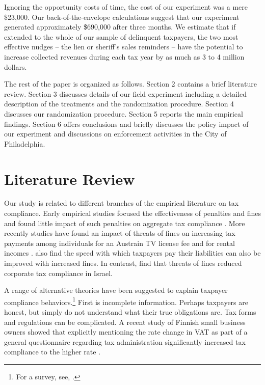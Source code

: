 \documentclass[12pt]{article}
\begin{document}
Ignoring the opportunity costs of time, the cost of our experiment was
a mere \$23,000.  Our back-of-the-envelope calculations suggest that
our experiment generated approximately \$690,000 after three
months. We estimate that if extended to the whole of our sample of
delinquent taxpayers, the two most effective nudges -- the lien or
sheriff's sales reminders -- have the potential to increase collected
revenues during each tax year by as much as 3 to 4 million dollars.

The rest of the paper is organized as follows. Section 2 contains a
brief literature review. Section 3 discusses details of our field
experiment including a detailed description of the treatments and the
randomization procedure. Section 4 discusses our randomization
procedure.  Section 5 reports the main empirical findings. Section 6
offers conclusions and briefly discusses the policy impact of our
experiment and discussions on enforcement activities in the City of
Philadelphia.
    

\section{Literature Review}

Our study is related to different branches of the empirical literature
on tax compliance. Early empirical studies focused the effectiveness
of penalties and fines and found little impact of such penalties on
aggregate tax compliance \cite{Slemrod-07}.  More recently studies
have found an impact of threats of fines on increasing tax payments
among individuals for an Austrain TV license fee \cite{Fellner-13} and
for rental incomes \cite{Wenzel-Taylor-04}.  
also find the speed with which taxpayers pay their liabilities can
also be improved with increased fines.  In contrast, 
find that threats of fines reduced corporate tax compliance in Israel.

A range of alternative theories have been suggested to explain
taxpayer compliance behaviors.\footnote{For a survey, see,
  .}  First is incomplete
information.  Perhaps taxpayers are honest, but simply do not
understand what their true obligations are. Tax forms and regulations
can be complicated.  A recent study of Finnish small business owners
showed that explicitly mentioning the rate change in VAT as part of a
general questionnaire regarding tax administration significantly
increased tax compliance to the higher rate .
\end{document}
